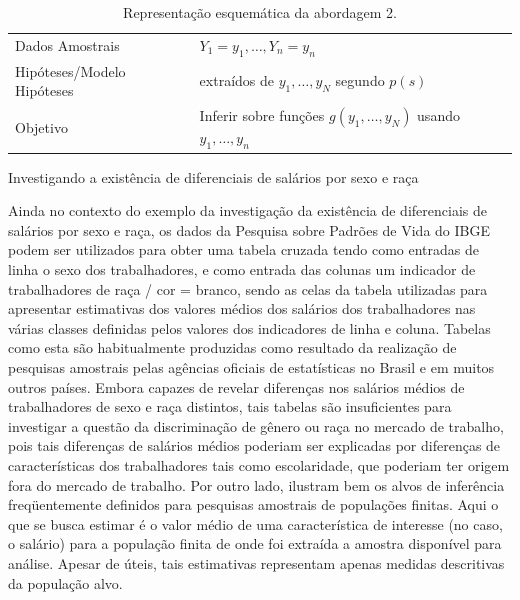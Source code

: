 \documentclass[]{book}
\theoremstyle{definition}
\theoremstyle{definition}
\theoremstyle{definition}
\theoremstyle{remark}
\begin{document}
\begin{longtable}[]{@{}ll@{}}
\caption{\label{tab:modelamo} Representação esquemática da abordagem
2.}\tabularnewline
\toprule
\begin{minipage}[t]{0.29\columnwidth}\raggedright\strut
Dados Amostrais\strut
\end{minipage} & \begin{minipage}[t]{0.60\columnwidth}\raggedright\strut
\(Y_1=y_1,\ldots, Y_n=y_n\)\strut
\end{minipage}\tabularnewline
\begin{minipage}[t]{0.29\columnwidth}\raggedright\strut
Hipóteses/Modelo Hipóteses\strut
\end{minipage} & \begin{minipage}[t]{0.60\columnwidth}\raggedright\strut
extraídos de \(y_1,\ldots,y_N\) segundo \(p(s)\)\strut
\end{minipage}\tabularnewline
\begin{minipage}[t]{0.29\columnwidth}\raggedright\strut
Objetivo\strut
\end{minipage} & \begin{minipage}[t]{0.60\columnwidth}\raggedright\strut
Inferir sobre funções \(g(y_1, \ldots, y_N)\) usando
\(y_1, \ldots,y_n\)\strut
\end{minipage}\tabularnewline
\bottomrule
\end{longtable}

Investigando a existência de diferenciais de salários por sexo e raça

Ainda no contexto do exemplo da investigação da existência de
diferenciais de salários por sexo e raça, os dados da Pesquisa sobre
Padrões de Vida do IBGE podem ser utilizados para obter uma tabela
cruzada tendo como entradas de linha o sexo dos trabalhadores, e como
entrada das colunas um indicador de trabalhadores de raça / cor =
branco, sendo as celas da tabela utilizadas para apresentar estimativas
dos valores médios dos salários dos trabalhadores nas várias classes
definidas pelos valores dos indicadores de linha e coluna. Tabelas como
esta são habitualmente produzidas como resultado da realização de
pesquisas amostrais pelas agências oficiais de estatísticas no Brasil e
em muitos outros países. Embora capazes de revelar diferenças nos
salários médios de trabalhadores de sexo e raça distintos, tais tabelas
são insuficientes para investigar a questão da discriminação de gênero
ou raça no mercado de trabalho, pois tais diferenças de salários médios
poderiam ser explicadas por diferenças de características dos
trabalhadores tais como escolaridade, que poderiam ter origem fora do
mercado de trabalho. Por outro lado, ilustram bem os alvos de inferência
freqüentemente definidos para pesquisas amostrais de populações finitas.
Aqui o que se busca estimar é o valor médio de uma característica de
interesse (no caso, o salário) para a população finita de onde foi
extraída a amostra disponível para análise. Apesar de úteis, tais
estimativas representam apenas medidas descritivas da população alvo.
\end{document}
